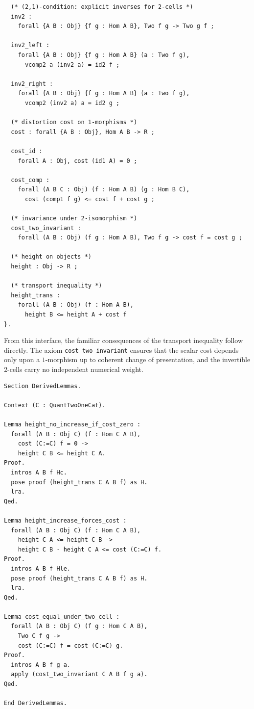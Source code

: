 \documentclass[10pt, reqno]{amsart}
\theoremstyle{plain}
\theoremstyle{definition}
\theoremstyle{plain}
\begin{document}
\begin{scriptsize}
\begin{verbatim}
  (* (2,1)-condition: explicit inverses for 2-cells *)
  inv2 :
    forall {A B : Obj} {f g : Hom A B}, Two f g -> Two g f ;

  inv2_left :
    forall {A B : Obj} {f g : Hom A B} (a : Two f g),
      vcomp2 a (inv2 a) = id2 f ;

  inv2_right :
    forall {A B : Obj} {f g : Hom A B} (a : Two f g),
      vcomp2 (inv2 a) a = id2 g ;

  (* distortion cost on 1-morphisms *)
  cost : forall {A B : Obj}, Hom A B -> R ;

  cost_id :
    forall A : Obj, cost (id1 A) = 0 ;

  cost_comp :
    forall (A B C : Obj) (f : Hom A B) (g : Hom B C),
      cost (comp1 f g) <= cost f + cost g ;

  (* invariance under 2-isomorphism *)
  cost_two_invariant :
    forall (A B : Obj) (f g : Hom A B), Two f g -> cost f = cost g ;

  (* height on objects *)
  height : Obj -> R ;

  (* transport inequality *)
  height_trans :
    forall (A B : Obj) (f : Hom A B),
      height B <= height A + cost f
}.
\end{verbatim}
\end{scriptsize}

From this interface, the familiar consequences of the transport inequality follow directly. The axiom \texttt{cost\_two\_invariant} ensures that the scalar cost depends only upon a $1$-morphism up to coherent change of presentation, and the invertible $2$-cells carry no independent numerical weight.

\begin{scriptsize}
\begin{verbatim}
Section DerivedLemmas.

Context (C : QuantTwoOneCat).

Lemma height_no_increase_if_cost_zero :
  forall (A B : Obj C) (f : Hom C A B),
    cost (C:=C) f = 0 ->
    height C B <= height C A.
Proof.
  intros A B f Hc.
  pose proof (height_trans C A B f) as H.
  lra.
Qed.

Lemma height_increase_forces_cost :
  forall (A B : Obj C) (f : Hom C A B),
    height C A <= height C B ->
    height C B - height C A <= cost (C:=C) f.
Proof.
  intros A B f Hle.
  pose proof (height_trans C A B f) as H.
  lra.
Qed.

Lemma cost_equal_under_two_cell :
  forall (A B : Obj C) (f g : Hom C A B),
    Two C f g ->
    cost (C:=C) f = cost (C:=C) g.
Proof.
  intros A B f g a.
  apply (cost_two_invariant C A B f g a).
Qed.

End DerivedLemmas.
\end{verbatim}
\end{scriptsize}
\end{document}
